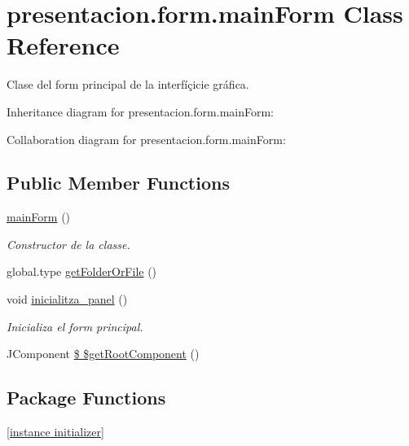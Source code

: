 \hypertarget{classpresentacion_1_1form_1_1mainForm}{}\section{presentacion.\+form.\+main\+Form Class Reference}
\label{classpresentacion_1_1form_1_1mainForm}


Clase del form principal de la interfíçicie gráfica.  




Inheritance diagram for presentacion.\+form.\+main\+Form\+:


Collaboration diagram for presentacion.\+form.\+main\+Form\+:
\subsection*{Public Member Functions}
\begin{DoxyCompactItemize}
\item 
\hyperlink{classpresentacion_1_1form_1_1mainForm_ac1236f4bc250bf2f5a4a01a072e77555}{main\+Form} ()
\begin{DoxyCompactList}\small\item\em Constructor de la classe. \end{DoxyCompactList}\item 
global.\+type \hyperlink{classpresentacion_1_1form_1_1mainForm_af6d62b4914fbc44469a3c173e0472c43}{get\+Folder\+Or\+File} ()
\item 
void \hyperlink{classpresentacion_1_1form_1_1mainForm_aae4c847b58c5d50945fa1dd27d534319}{inicialitza\+\_\+panel} ()
\begin{DoxyCompactList}\small\item\em Inicializa el form principal. \end{DoxyCompactList}\item 
J\+Component \hyperlink{classpresentacion_1_1form_1_1mainForm_a7a42bc26bc20cc928c82bac33c43764c}{\$ \$get\+Root\+Component} ()
\end{DoxyCompactItemize}
\subsection*{Package Functions}
\begin{DoxyCompactItemize}
\item 
\hyperlink{classpresentacion_1_1form_1_1mainForm_a5db496bbae052ad3d04d03e194db82e4}{\mbox{[}instance initializer\mbox{]}}
\end{DoxyCompactItemize}
